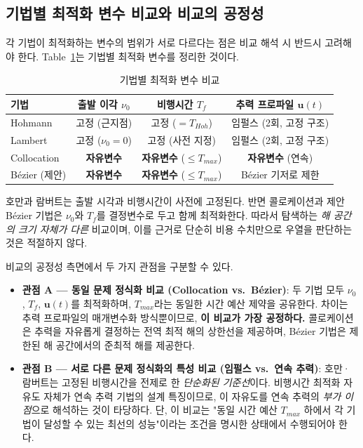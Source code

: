 \documentclass[11pt]{article}
\begin{document}
\subsection{기법별 최적화 변수 비교와 비교의 공정성}

각 기법이 최적화하는 변수의 범위가 서로 다르다는 점은 비교 해석 시 반드시 고려해야 한다.
Table~\ref{tab:opt_vars}는 기법별 최적화 변수를 정리한 것이다.

\begin{table}[!ht]
\centering
\caption{기법별 최적화 변수 비교}
\label{tab:opt_vars}
\begin{tabular}{lccc}
\toprule
기법 & 출발 이각 $\nu_0$ & 비행시간 $T_f$ & 추력 프로파일 $\mathbf{u}(t)$ \\
\midrule
Hohmann    & 고정 (근지점) & 고정 ($= T_{Hoh}$) & 임펄스 (2회, 고정 구조) \\
Lambert    & 고정 ($\nu_0 = 0$) & 고정 (사전 지정) & 임펄스 (2회, 고정 구조) \\
Collocation & \textbf{자유변수} & \textbf{자유변수} ($\leq T_{max}$) & \textbf{자유변수} (연속) \\
B\'{e}zier (제안) & \textbf{자유변수} & \textbf{자유변수} ($\leq T_{max}$) & B\'{e}zier 기저로 제한 \\
\bottomrule
\end{tabular}
\end{table}

호만과 람버트는 출발 시각과 비행시간이 사전에 고정된다.
반면 콜로케이션과 제안 B\'{e}zier 기법은 $\nu_0$와 $T_f$를 결정변수로 두고 함께 최적화한다.
따라서 탐색하는 \textit{해 공간의 크기 자체가 다른} 비교이며, 이를 근거로 단순히 비용 수치만으로 우열을 판단하는 것은 적절하지 않다.

비교의 공정성 측면에서 두 가지 관점을 구분할 수 있다.

\begin{itemize}
  \item \textbf{관점 A — 동일 문제 정식화 비교 (Collocation vs.\ B\'{e}zier)}: 두 기법 모두 $\nu_0$, $T_f$, $\mathbf{u}(t)$를 최적화하며, $T_{max}$라는 동일한 시간 예산 제약을 공유한다. 차이는 추력 프로파일의 매개변수화 방식뿐이므로, \textbf{이 비교가 가장 공정하다.} 콜로케이션은 추력을 자유롭게 결정하는 전역 최적 해의 상한선을 제공하며, B\'{e}zier 기법은 제한된 해 공간에서의 준최적 해를 제공한다.

  \item \textbf{관점 B — 서로 다른 문제 정식화의 특성 비교 (임펄스 vs.\ 연속 추력)}: 호만·람버트는 고정된 비행시간을 전제로 한 \textit{단순화된 기준선}이다. 비행시간 최적화 자유도 자체가 연속 추력 기법의 설계 특징이므로, 이 자유도를 연속 추력의 \textit{부가 이점}으로 해석하는 것이 타당하다. 단, 이 비교는 "동일 시간 예산 $T_{max}$ 하에서 각 기법이 달성할 수 있는 최선의 성능"이라는 조건을 명시한 상태에서 수행되어야 한다.
\end{itemize}
\end{document}
